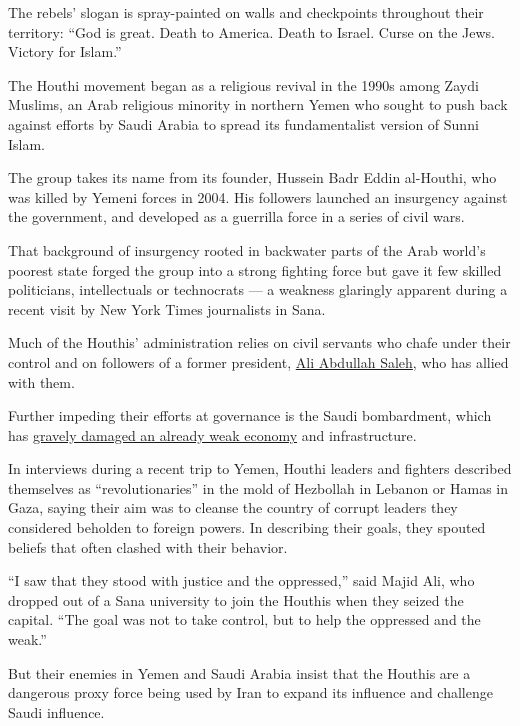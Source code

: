 The rebels' slogan is spray-painted on walls and checkpoints throughout
their territory: ``God is great. Death to America. Death to Israel.
Curse on the Jews. Victory for Islam.''

The Houthi movement began as a religious revival in the 1990s among
Zaydi Muslims, an Arab religious minority in northern Yemen who sought
to push back against efforts by Saudi Arabia to spread its
fundamentalist version of Sunni Islam.

The group takes its name from its founder, Hussein Badr Eddin al-Houthi,
who was killed by Yemeni forces in 2004. His followers launched an
insurgency against the government, and developed as a guerrilla force in
a series of civil wars.

That background of insurgency rooted in backwater parts of the Arab
world's poorest state forged the group into a strong fighting force but
gave it few skilled politicians, intellectuals or technocrats --- a
weakness glaringly apparent during a recent visit by New York Times
journalists in Sana.

Much of the Houthis' administration relies on civil servants who chafe
under their control and on followers of a former president,
\href{http://www.nytimes.com/2014/02/01/world/middleeast/even-out-of-office-a-wielder-of-great-power-in-yemen.html}{Ali
Abdullah Saleh}, who has allied with them.

Further impeding their efforts at governance is the Saudi bombardment,
which has
\href{http://www.nytimes.com/2016/11/14/world/middleeast/yemen-saudi-bombing-houthis-hunger.html}{gravely
damaged an already weak economy} and infrastructure.

In interviews during a recent trip to Yemen, Houthi leaders and fighters
described themselves as ``revolutionaries'' in the mold of Hezbollah in
Lebanon or Hamas in Gaza, saying their aim was to cleanse the country of
corrupt leaders they considered beholden to foreign powers. In
describing their goals, they spouted beliefs that often clashed with
their behavior.

``I saw that they stood with justice and the oppressed,'' said Majid
Ali, who dropped out of a Sana university to join the Houthis when they
seized the capital. ``The goal was not to take control, but to help the
oppressed and the weak.''

But their enemies in Yemen and Saudi Arabia insist that the Houthis are
a dangerous proxy force being used by Iran to expand its influence and
challenge Saudi influence.

